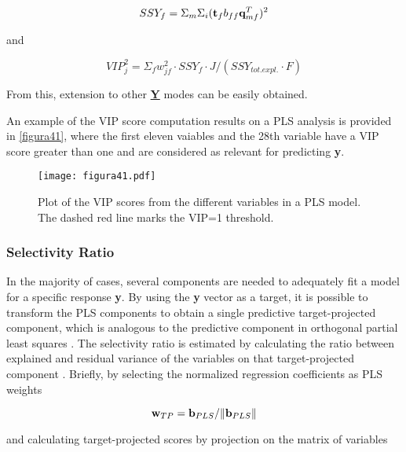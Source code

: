 \begin{equation}
SSY_{f}=\Sigma_m\Sigma_i(\textbf{\text{t}}_fb_{ff}\textbf{\text{q}}^T_{mf})^2
\label{equation28}
\end{equation}

and

\begin{equation}
VIP^2_j=\Sigma_fw^2_{jf} \cdot SSY_{f} \cdot J/(SSY_{tot.expl.} \cdot F)
\label{equation29}
\end{equation}

From this, extension to other \textbf{\underline{Y}} modes can be easily obtained.

An example of the VIP score computation results on a PLS analysis is provided in \autoref{figura41}, where the first eleven vaiables and the 28th variable have a VIP score greater than one and are considered as relevant for predicting \textbf{y}.

\begin{figure}[hbtp]
\centering
\texttt{[image: figura41.pdf]}
\caption[Plot of the VIP scores from the different variables in a PLS model]{Plot of the VIP scores from the different variables in a PLS model. The dashed red line marks the VIP=1 threshold.}
\label{figura41}
\end{figure}

\subsubsection{Selectivity Ratio}
In the majority of cases, several components are needed to adequately fit a model for a specific response \textbf{y}. By using the \textbf{y} vector as a target, it is possible to transform the PLS components to obtain a single predictive target-projected component, which is analogous to the predictive component in orthogonal partial least squares \parencite{bylesjo2006opls}. The selectivity ratio is estimated by calculating the ratio between explained and residual variance of the variables on that target-projected component \parencite{rajalahti2009biomarker}. Briefly, by selecting the normalized regression coefficients as PLS weights

\begin{equation}
\textbf{\text{w}}_{TP}=\textbf{\text{b}}_{PLS}/\|\textbf{\text{b}}_{PLS}\|
\label{equation30}
\end{equation}

and calculating target-projected scores by projection on the matrix of variables

